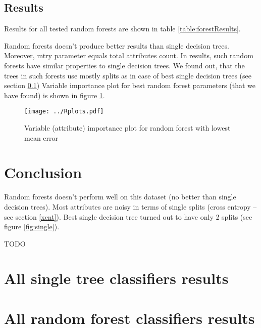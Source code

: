 \documentclass[a4paper]{article}
\begin{document}
\begin{multicols}{2}
\subsection{Results}
\label{singleConc}
Results for all tested random forests are shown in table \ref{table:forestResults}.

Random forests doesn't produce better results than single decision trees.
Moreover, mtry parameter equals total attributes count.
In results, such random forests have similar properties to single decision trees.
We found out, that the trees in such forests use mostly splits as
in case of best single decision trees (see section \ref{singleConc})
Variable importance plot for best random forest parameters (that we have found)
is shown in figure \ref{fig:importance}.


\begin{figure}[H]
    \centering
    \texttt{[image: ../Rplots.pdf]}
    \label{fig:importance}
    \caption[]{Variable (attribute) importance plot for random forest with lowest mean error}
\end{figure}


% 
% 
\section{Conclusion}

Random forests doesn't perform well on this dataset (no better than single decision trees).
Most attributes are noisy in terms of single splits (cross entropy -- see section \ref{xent}).
Best single decision tree turned out to have only 2 splits (see figure \ref{fig:single}).

TODO


\end{multicols}

\newpage
\appendix
\section{All single tree classifiers results}
% 


\newpage
\section{All random forest classifiers results}
% 

\end{document}
